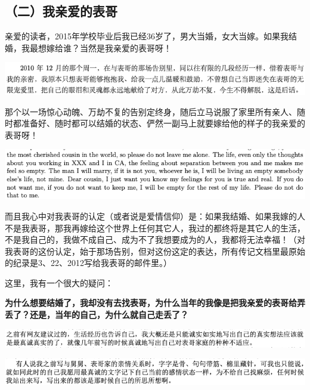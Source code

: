 \documentclass[9pt, b5paper]{article}
\begin{document}
\subsection{（二）我亲爱的表哥}
\label{sec:orga541946}

亲爱的读者，2015年学校毕业后我已经36岁了，男大当婚，女大当嫁。如果我结婚，我最想嫁给谁？当然是我亲爱的表哥呀！

\begin{center}
\includegraphics[width=.9\linewidth]{./pic/backups_plans_20210426_112346.png}
\end{center}

那个以一场惊心动魄、万劫不复的告别定终身，随后立马说服了家里所有亲人、随时都准备好、随时都可以结婚的状态、俨然一副马上就要嫁给他的样子的我亲爱的表哥呀！

\begin{center}
\includegraphics[width=.9\linewidth]{./pic/backups_plans_20210423_201706.png}
\end{center}

而且我心中对我表哥的认定（或者说是爱情信仰）是：如果我结婚、如果我嫁的人不是我表哥，那我再嫁给这个世界上任何其它人，我过的都终将是其它人的生活，不是我自己的，我做不成自己、成为不了我想要成为的人，我都将无法幸福！（对我表哥的这份认定，始于那场告别，但对这份这定的表达，所有传记文档里最原始的纪录是3、22、2012写给我表哥的邮件里。）

这里，我有一个很大的疑问：

\textbf{为什么想要结婚了，我却没有去找表哥，为什么当年的我像是把我亲爱的表哥给弄丢了？还是，当年的自己，为什么就自己走丢了？}

\begin{center}
\includegraphics[width=.9\linewidth]{./pic/backups_plans_20210426_112108.png}
\end{center}

\begin{center}
\includegraphics[width=.9\linewidth]{./pic/backups_plans_20210426_114722.png}
\end{center}
\end{document}
